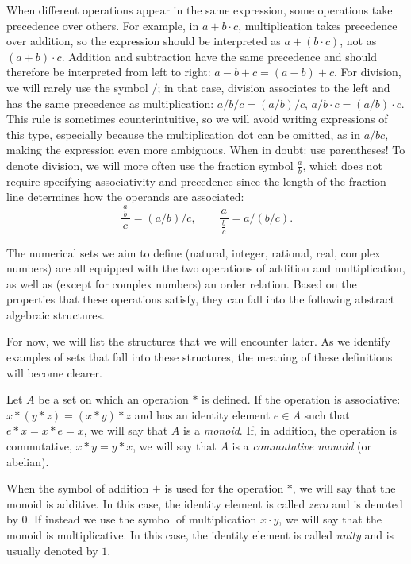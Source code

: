When different operations appear in the same expression, some operations take
precedence over others. For example, in $a+b\cdot c$, multiplication takes
precedence over addition, so the expression should be interpreted as $a+(b\cdot
c)$, not as $(a+b)\cdot c$. Addition and subtraction have the same precedence
and should therefore be interpreted from left to right: $a-b+c = (a-b)+c$. For
division, we will rarely use the symbol $/$; in that case, division associates
to the left and has the same precedence as multiplication: $a/b/c=(a/b)/c$,
$a/b\cdot c=(a/b)\cdot c$. This rule is sometimes counterintuitive, so we will
avoid writing expressions of this type, especially because the multiplication
dot can be omitted, as in $a/bc$, making the expression even more ambiguous.
When in doubt: use parentheses! To denote division, we will more often use the
fraction symbol $\frac a b$, which does not require specifying associativity and
precedence since the length of the fraction line determines how the operands are
associated:
\[
  \frac{\,\frac a b\,}{c}=(a/b)/c, \qquad 
  \frac{a}{\,\frac bc\,}=a/(b/c).
\]  

The numerical sets we aim to define (natural, integer, rational, real, complex
numbers) are all equipped with the two operations of addition and
multiplication, as well as (except for complex numbers) an order relation. Based
on the properties that these operations satisfy, they can fall into the
following abstract algebraic structures.

For now, we will list the structures that we will encounter later. As we
identify examples of sets that fall into these structures, the meaning of these
definitions will become clearer.

\begin{definition}[Monoid]%
  \label{def:monoide}%
    Let $A$ be a set on which an operation $*$ is defined. If the operation is
  associative: $x*(y*z) = (x*y)*z$ and has an identity element $e\in A$ such
  that $e*x = x*e = x$, we will say that $A$ is a \emph{monoid}. If, in
  addition, the operation is commutative, $x*y=y*x$, we will say that $A$ is a
  \emph{commutative monoid} (or abelian).
  
    When the symbol of addition $+$ is used for the operation $*$, we will say
  that the monoid is additive. In this case, the identity element is called
  \emph{zero} and is denoted by $0$. If instead we use the symbol of
  multiplication $x\cdot y$, we will say that the monoid is multiplicative. In
  this case, the identity element is called \emph{unity} and is usually denoted
  by $1$.
\end{definition}
  
